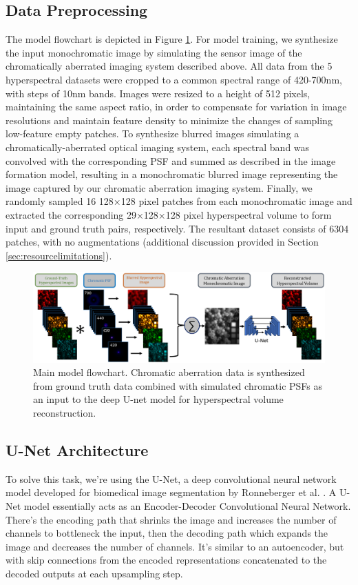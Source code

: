 \documentclass{article}
\begin{document}
\subsection{Data Preprocessing}
The model flowchart is depicted in Figure \ref{fig:mainflow}. For model training, we synthesize the input monochromatic image by simulating the sensor image of the chromatically aberrated imaging system described above. All data from the 5 hyperspectral datasets were cropped to a common spectral range of 420-700nm, with steps of 10nm bands. Images were resized to a height of 512 pixels, maintaining the same aspect ratio, in order to compensate for variation in image resolutions and maintain feature density to minimize the changes of sampling low-feature empty patches. To synthesize blurred images simulating a chromatically-aberrated optical imaging system, each spectral band was convolved with the corresponding PSF and summed as described in the image formation model, resulting in a monochromatic blurred image representing the image captured by our chromatic aberration imaging system. Finally, we randomly sampled 16 128×128 pixel patches from each monochromatic image and extracted the corresponding 29×128×128 pixel hyperspectral volume to form input and ground truth pairs, respectively. The resultant dataset consists of 6304 patches, with no augmentations (additional discussion provided in Section \ref{sec:resourcelimitations}).

\begin{figure}
    \centering
    \includegraphics[width=\textwidth]{figs/mainflow.png}
    \caption{Main model flowchart. Chromatic aberration data is synthesized from ground truth data combined with simulated chromatic PSFs as an input to the deep U-net model for hyperspectral volume reconstruction.}
    \label{fig:mainflow}
\end{figure}


\subsection{U-Net Architecture}
To solve this task, we're using the U-Net, a deep convolutional neural network model developed for biomedical image segmentation by Ronneberger et al. \cite{Ronneberger_2018}. A U-Net model essentially acts as an Encoder-Decoder Convolutional Neural Network. There's the encoding path that shrinks the image and increases the number of channels to bottleneck the input, then the decoding path which expands the image and decreases the number of channels. It's similar to an autoencoder, but with skip connections from the encoded representations concatenated to the decoded outputs at each upsampling step.
\end{document}
